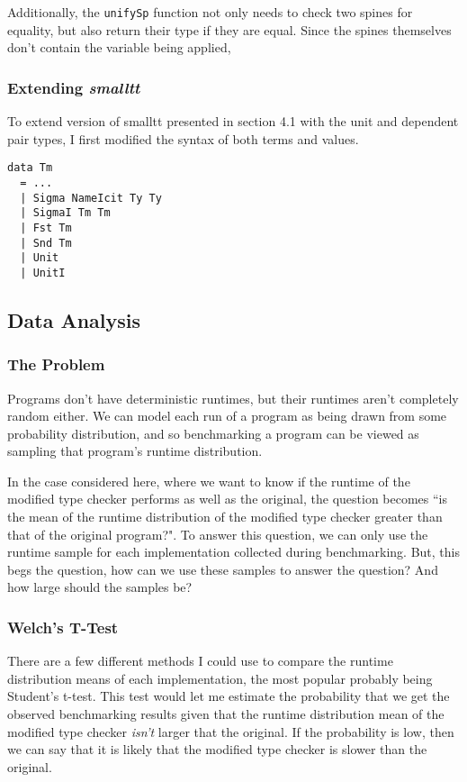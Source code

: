 \documentclass{article}
\begin{document}
Additionally, the \lstinline{unifySp} function not only needs to check two spines for equality, but also return their type if they are equal.
Since the spines themselves don't contain the variable being applied, 

\subsubsection{Extending \textit{smalltt}}

To extend version of smalltt presented in section 4.1 with the unit and dependent pair types, I first modified the syntax of both terms and values.

\begin{lstlisting}
data Tm
  = ...
  | Sigma NameIcit Ty Ty
  | SigmaI Tm Tm
  | Fst Tm
  | Snd Tm
  | Unit
  | UnitI
\end{lstlisting}


\subsection{Data Analysis}

\subsubsection{The Problem}

Programs don't have deterministic runtimes, but their runtimes aren't completely random either.
We can model each run of a program as being drawn from some probability distribution, and so benchmarking a program can be viewed as sampling that program's runtime distribution.

In the case considered here, where we want to know if the runtime of the modified type checker performs as well as the original, the question becomes ``is the mean of the runtime distribution of the modified type checker greater than that of the original program?".
To answer this question, we can only use the runtime sample for each implementation collected during benchmarking.
But, this begs the question, how can we use these samples to answer the question?
And how large should the samples be?

\subsubsection{Welch's T-Test}

There are a few different methods I could use to compare the runtime distribution means of each implementation, the most popular probably being Student's t-test.
This test would let me estimate the probability that we get the observed benchmarking results given that the runtime distribution mean of the modified type checker \textit{isn't} larger that the original.
If the probability is low, then we can say that it is likely that the modified type checker is slower than the original.
\end{document}
